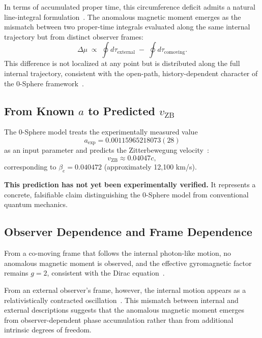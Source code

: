 \documentclass[12pt,letterpaper]{article}
\begin{document}
In terms of accumulated proper time, this circumference deficit admits a natural line-integral formulation~\cite{hanamura18203433}. The anomalous magnetic moment emerges as the mismatch between two proper-time integrals evaluated along the same internal trajectory but from distinct observer frames:
\begin{equation}
\Delta \mu \;\propto\; \oint d\tau_{\text{external}} \;-\; \oint d\tau_{\text{comoving}}.
\end{equation}
This difference is not localized at any point but is distributed along the full internal trajectory, consistent with the open-path, history-dependent character of the 0-Sphere framework~\cite{hanamura18203433}.

\subsection{From Known $a$ to Predicted $v_{\mathrm{ZB}}$}

The 0-Sphere model treats the experimentally measured value
\begin{equation}
a_{\mathrm{exp}} = 0.00115965218073(28)
\end{equation}
as an input parameter and predicts the Zitterbewegung velocity~\cite{hanamura18356895}:
\begin{equation}
v_{\mathrm{ZB}} \approx 0.04047c,
\end{equation}
corresponding to $\beta_e = 0.040472$ (approximately 12,100 km/s).

\textbf{This prediction has not yet been experimentally verified.} It represents a concrete, falsifiable claim distinguishing the 0-Sphere model from conventional quantum mechanics.

\subsection{Observer Dependence and Frame Dependence}

From a co-moving frame that follows the internal photon-like motion, no anomalous magnetic moment is observed, and the effective gyromagnetic factor remains $g = 2$, consistent with the Dirac equation~\cite{Dirac1928,hanamura17765409}.

From an external observer's frame, however, the internal motion appears as a relativistically contracted oscillation~\cite{hanamura17765409}. This mismatch between internal and external descriptions suggests that the anomalous magnetic moment emerges from observer-dependent phase accumulation rather than from additional intrinsic degrees of freedom.
\end{document}
